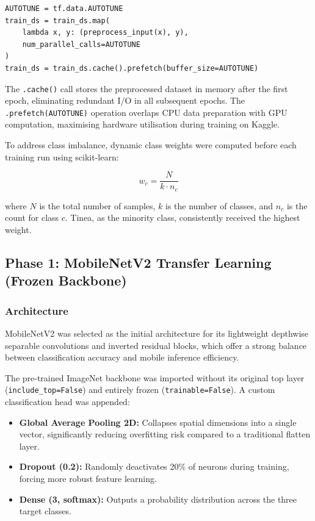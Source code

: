 \begin{verbatim}
AUTOTUNE = tf.data.AUTOTUNE
train_ds = train_ds.map(
    lambda x, y: (preprocess_input(x), y),
    num_parallel_calls=AUTOTUNE
)
train_ds = train_ds.cache().prefetch(buffer_size=AUTOTUNE)
\end{verbatim}

The \texttt{.cache()} call stores the preprocessed dataset in memory after the first epoch, eliminating redundant I/O in all subsequent epochs. The \texttt{.prefetch(AUTOTUNE)} operation overlaps CPU data preparation with GPU computation, maximising hardware utilisation during training on Kaggle.

To address class imbalance, dynamic class weights were computed before each training run using scikit-learn:

\begin{equation}
w_c = \frac{N}{k \cdot n_c}
\end{equation}

where $N$ is the total number of samples, $k$ is the number of classes, and $n_c$ is the count for class $c$. Tinea, as the minority class, consistently received the highest weight.

\subsection{Phase 1: MobileNetV2 Transfer Learning (Frozen Backbone)}
\label{sec:phase1}

\subsubsection{Architecture}

MobileNetV2 was selected as the initial architecture for its lightweight depthwise separable convolutions and inverted residual blocks, which offer a strong balance between classification accuracy and mobile inference efficiency.

The pre-trained ImageNet backbone was imported without its original top layer (\texttt{include\_top=False}) and entirely frozen (\texttt{trainable=False}). A custom classification head was appended:

\begin{itemize}
    \item \textbf{Global Average Pooling 2D:} Collapses spatial dimensions into a single vector, significantly reducing overfitting risk compared to a traditional flatten layer.
    \item \textbf{Dropout (0.2):} Randomly deactivates 20\% of neurons during training, forcing more robust feature learning.
    \item \textbf{Dense (3, softmax):} Outputs a probability distribution across the three target classes.
\end{itemize}


